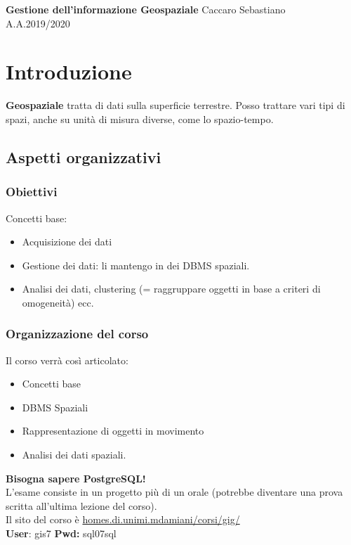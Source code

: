 \documentclass[a4paper,12pt]{article}
\begin{document}
\begin{titlepage}
\begin{center}
	\Large{\textbf{Gestione dell'informazione Geospaziale}}
\vfill
\normalsize{Caccaro Sebastiano}\\
\normalsize{A.A.2019/2020}
\end{center}
\end{titlepage}
\tableofcontents

\clearpage


\section{Introduzione}
\textbf{Geospaziale} tratta di dati sulla superficie terrestre. Posso trattare vari tipi di spazi, anche su unità di misura diverse, come lo spazio-tempo.

\subsection{Aspetti organizzativi}
\subsubsection{Obiettivi}
Concetti base:
\begin{itemize}
	\item Acquisizione dei dati
	\item Gestione dei dati: li mantengo in dei DBMS spaziali.
	\item Analisi dei dati, clustering (= raggruppare oggetti in base a criteri di omogeneità) ecc.
\end{itemize}

\subsubsection{Organizzazione del corso}
Il corso verrà così articolato:
\begin{itemize}
	\item Concetti base
	\item DBMS Spaziali
	\item Rappresentazione di oggetti in movimento
	\item Analisi dei dati spaziali.	
\end{itemize}

\textbf{Bisogna sapere PostgreSQL!}\\
L'esame consiste in un progetto più di un orale (potrebbe diventare una prova scritta all'ultima lezione del corso).\\
Il sito del corso è \url{homes.di.unimi.mdamiani/corsi/gig/}\\
\textbf{User}: gis7 \textbf{Pwd:} sql07sql
\end{document}
